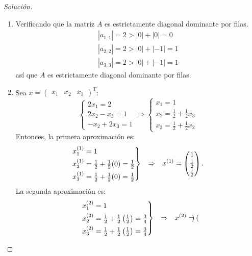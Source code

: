 \documentclass[12pt]{book}
\newcommand\abs[1]{\left\lvert#1\right\rvert}
\newenvironment{solucion}
  {\renewcommand\qedsymbol{$\square$}\begin{proof}[Solución]}
  {\end{proof}}
\begin{document}
\begin{solucion}
\renewcommand{\labelenumi}{(\alph{enumi})}
\begin{enumerate}
    \item Verificando que la matriz $A$ es estrictamente diagonal dominante por filas.
    \begin{align*}
        \abs{a_{1,1}}=2>\abs{0}+\abs{0}=0\\
        \abs{a_{2,2}}=2>\abs{0}+\abs{-1}=1\\
        \abs{a_{3,3}}=2>\abs{0}+\abs{-1}=1
    \end{align*}
     así que $A$ es estrictamente diagonal dominante por filas.
    \item Sea $x=\begin{pmatrix}
    x_1&
    x_2&
    x_3
    \end{pmatrix}^T$:
    \[\begin{cases*}
        2x_1=2\\
        2x_2-x_3=1\\
        -x_2+2x_3=1
    \end{cases*}\Rightarrow\begin{cases*}
    x_1=1\\
    x_2=\frac{1}{2}+\frac{1}{2}x_3\\
    x_3=\frac{1}{2}+\frac{1}{2}x_2
    \end{cases*}\]
    Entonces, la primera aproximación es:
    \begin{align*}
        \begin{rcases*}
        x_1^{(1)}=1\\
    x_2^{(1)}=\frac{1}{2}+\frac{1}{2}(0)=\frac{1}{2}\\
    x_3^{(1)}=\frac{1}{2}+\frac{1}{2}(0)=\frac{1}{2}\end{rcases*} && \Rightarrow && x^{(1)}=\begin{pmatrix}
    1\\
    \frac{1}{2}\\
    \frac{1}{2}
    \end{pmatrix}.
    \end{align*}
    La segunda aproximación es:
    \begin{align*}
        \begin{rcases*}
        x_1^{(2)}=1\\
    x_2^{(2)}=\frac{1}{2}+\frac{1}{2}\left(\frac{1}{2}\right)=\frac{3}{4}\\
    x_3^{(2)}=\frac{1}{2}+\frac{1}{2}\left(\frac{1}{2}\right)=\frac{3}{4}\end{rcases*} && \Rightarrow && x^{(2)}=\begin{pmatrix}

\end{pmatrix}
\end{align*}
\end{enumerate}
\end{solucion}
\end{document}
